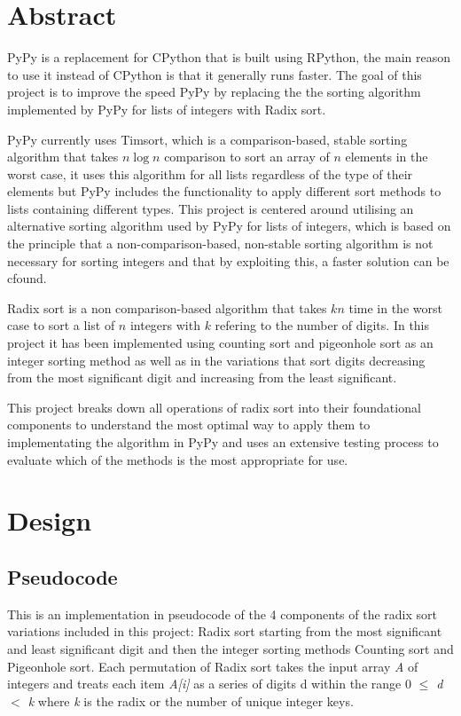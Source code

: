 \documentclass[12pt]{article}
\begin{document}
{
  \hypersetup{linkcolor=black}
  \tableofcontents
}
\newcommand{\myparagraph}[1]{\paragraph{#1}\mbox{}\\}
\pagebreak
\section{Abstract}
PyPy is a replacement for CPython that is built using RPython, the main reason to use it instead of CPython is that it generally runs faster. The goal of this project is to improve the speed PyPy by replacing the the sorting algorithm implemented by PyPy for lists of integers with Radix sort.
\par
PyPy currently uses Timsort, which is a comparison-based, stable sorting algorithm that takes $n\log{n}$ comparison to sort an array of $n$ elements in the worst case, it uses this algorithm for all lists regardless of the type of their elements but PyPy includes the functionality to apply different sort methods to lists containing different types. This project is centered around utilising an alternative sorting algorithm used by PyPy for lists of integers, which is based on the principle that a non-comparison-based, non-stable sorting algorithm is not necessary for sorting integers and that by exploiting this, a faster solution can be cfound. 
\par
Radix sort is a non comparison-based algorithm that takes $kn$ time in the worst case to sort a list of $n$ integers with $k$ refering to the number of digits. In this project it has been implemented using counting sort and pigeonhole sort as an integer sorting method as well as in the variations that sort digits decreasing from the most significant digit and increasing from the least significant.
\par
This project breaks down all operations of radix sort into their foundational components to understand the most optimal way to apply them to implementating the algorithm in PyPy and uses an extensive testing process to evaluate which of the methods is the most appropriate for use.
\pagebreak

\section{Design}
\label{sec:design}
	\subsection{Pseudocode}
	This is an implementation in pseudocode of the 4 components of the radix sort variations included in this project: Radix sort starting from the most significant and least significant digit and then the integer sorting methods Counting sort and Pigeonhole sort. Each permutation of Radix sort takes the input array \textit{A} of integers and treats each item \textit{A[i]} as a series of digits d within the range 0 \textit{$\leq$ d $<$ k} where \textit{k} is the radix or the number of unique integer keys. 
\end{document}

